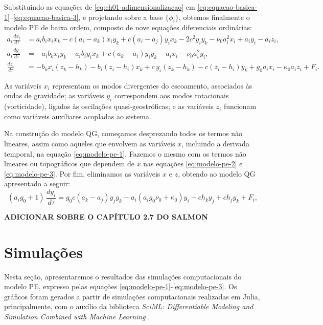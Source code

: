 Substituindo as equações de \eqref{eq:ch01-adimensionalizacao} em \eqref{eq:equacao-basica-1}–\eqref{eq:equacao-basica-3}, e projetando sobre a base $\{\phi_i\}$, obtemos finalmente o modelo PE de baixa ordem, composto de nove equações diferenciais ordinárias:
\begin{align}
	a_i\frac{dx_i}{d\tau} & = a_ib_ix_ix_k - c(a_i - a_k)x_iy_k      
	+ c(a_i - a_j)y_ix_k -2c^2y_iy_k - \nu_0a_i^2x_i + a_iy_i - a_iz_i, \label{eq:modelo-pe-1}\\
	a_i\frac{dy_i}{d\tau} & = -a_ib_kx_iy_k - a_ib_iy_ix_k           
	+ c(a_k - a_i)y_iy_k - a_ix_i - \nu_0a_i^2y_i, \label{eq:modelo-pe-2}\\
	\frac{dz_i}{d\tau}    & = -b_kx_i(z_k - h_k) - b_i(z_i - h_i)x_k 
	+ c\,y_i(z_k - h_k) - c(z_i - h_i)y_k + g_0a_ix_i - \kappa_0a_iz_i + F_i. \label{eq:modelo-pe-3}
\end{align}

As variáveis $x_i$ representam os modos divergentes do escoamento, associados às ondas de gravidade; as variáveis $y_i$ correspondem aos modos rotacionais (vorticidade), ligados às oscilações quasi-geostróficas; e as variáveis $z_i$ funcionam como variáveis auxiliares acopladas ao sistema.

Na construção do modelo QG, começamos desprezando todos os termos não lineares, assim como aqueles que envolvem as variáveis $x$, incluindo a derivada temporal, na equação \eqref{eq:modelo-pe-1}. Fazemos o mesmo com os termos não lineares ou topográficos que dependem de $x$ nas equações \eqref{eq:modelo-pe-2} e \eqref{eq:modelo-pe-3}. Por fim, eliminamos as variáveis $x$ e $z$, obtendo ao modelo QG apresentado a seguir:
\begin{equation}
	(a_i g_0 + 1)\,\frac{dy_i}{d\tau} 
	= g_0 c (a_k - a_j) y_j y_k 
	- a_i (a_i g_0 \nu_0 + \kappa_0) y_i 
	- c h_k y_j + c h_j y_k + F_i,
	\label{eq:modelo_lorenz_deterministico_qg}
\end{equation}

\textbf{ADICIONAR SOBRE O CAPÍTULO 2.7 DO SALMON}

\section{Simulações} \label{sec:ch01_simulacoes_deterministico}
Nesta seção, apresentaremos o resultados das simulações computacionais do modelo PE, expresso pelas equações \eqref{eq:modelo-pe-1}-\eqref{eq:modelo-pe-3}. Os gráficos foram gerados a partir de simulações computacionais realizadas em Julia, principalmente, com o auxílio da biblioteca \textit{SciML: Differentiable Modeling and Simulation Combined with Machine Learning} \citep{Rackauckas2017}. 

